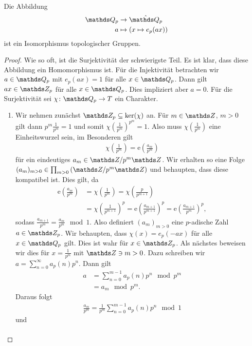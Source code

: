 \begin{prop}
Die Abbildung
\begin{align*}
\Q_p &\to \hat{\Q_p}\\
a &\mapsto (x \mapsto e_p(ax))
\end{align*}
ist ein Isomorphismus topologischer Gruppen.
\end{prop}
\begin{proof}
Wie so oft, ist die Surjektivität der schwierigste Teil.
Es ist klar, dass diese Abbildung ein Homomorphismus ist.
Für die Injektivität betrachten wir $a \in \Q_p$ mit $e_p(ax)=1$ für alle $x\in \Q_p$.
Dann gilt $ax \in \Z_p$ für alle $x\in \Q_p$. Dies impliziert aber $a=0$.
Für die Surjektivität sei $\chi\colon \Q_p \to T$ ein Charakter.
\begin{enumerate}[label=\roman*)]
\item Wir nehmen zunächst $\Z_p\subseteq \ker(\chi)$ an.
Für $m\in \Z$, $m>0$ gilt dann
$p^m \frac{1}{p^m}=1$ und somit $\chi(\frac{1}{p^m})^{p^m}=1$.
Also muss $\chi(\frac{1}{p^m})$ eine Einheitswurzel sein, im Besonderen gilt
\begin{align*}
\chi\left(\frac{1}{p^m}\right)=\mathrm{e}\left(\frac{a_m}{p^m}\right)
\end{align*}
für ein eindeutiges $a_m \in \Z/p^m\Z$.
Wir erhalten so eine Folge $(a_m)_{m> 0} \in \prod_{m>0} \left(\Z/p^m\Z\right)$ und behaupten, dass diese kompatibel ist.
Dies gilt, da
\begin{align*}
\mathrm{e}\left(\frac{a_m}{p^m}\right)&=\chi\left(\frac{1}{p^m}\right)=\chi\left(\frac{p}{p^{m+1}}\right)\\
&=\chi\left(\frac{1}{p^{m+1}}\right)^p=\mathrm{e}\left(\frac{a_{m+1}}{p^{m+1}}\right)^p=\mathrm{e}\left(\frac{a_{m+1}}{p^{m}}\right)^p,
\end{align*}
sodass $\frac{a_{m+1}}{p^m}=\frac{a_m}{p^m}\mod 1$.
Also definiert $(a_m)_{m>0}$ eine $p$-adische Zahl $a\in \Z_p$.
Wir behaupten, dass $\chi(x)=e_p(-ax)$ für alle $x\in \Q_p$ gilt. Dies ist wahr für $x\in \Z_p$.
Als nächstes beweisen wir dies für $x=\frac{1}{p^m}$ mit $\Z \ni m>0$.
Dazu schreiben wir $a=\sum_{n=0}^\infty a_p(n)p^n$. Dann gilt
\begin{align*}
a&=\sum_{n=0}^{m-1}a_p(n)p^n \mod p^m\\
&=a_m \mod p^m.
\end{align*}
Daraus folgt
\begin{align*}
\frac{a_m}{p^m}=\frac{1}{p^m} \sum_{n=0}^{m-1} a_p(n)p^n \mod 1
\end{align*}
und
\begin{align*}

\end{align*}
\end{enumerate}
\end{proof}
